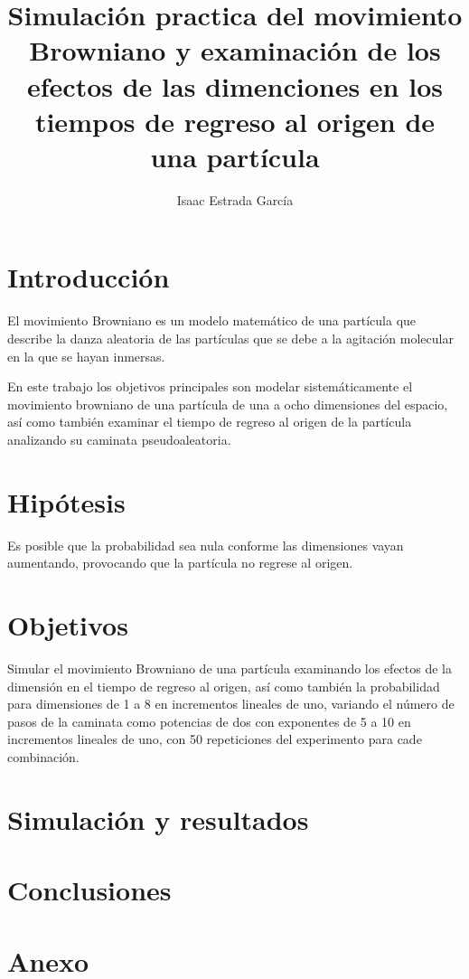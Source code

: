 \documentclass{article}
\title{Simulaci\'{o}n practica del movimiento Browniano y examinaci\'{o}n de los efectos de las dimenciones en los tiempos de regreso al origen de una part\'{i}cula}
\author{Isaac Estrada Garc\'{i}a }
\begin{document}
\maketitle

\section{Introducci\'{o}n}
El movimiento Browniano es un modelo matem\'{a}tico de una part\'{i}cula que describe la danza aleatoria de las part\'{i}culas que se debe a la agitaci\'{o}n molecular en la que se hayan inmersas.

En este trabajo los objetivos principales son modelar sistem\'{a}ticamente el movimiento browniano de una part\'{i}cula de una a ocho dimensiones del espacio, as\'{i} como tambi\'{e}n examinar el tiempo de regreso al origen de la part\'{i}cula analizando su caminata pseudoaleatoria.

\section{Hip\'{o}tesis}
Es posible que la probabilidad sea nula conforme las dimensiones vayan aumentando, provocando que la part\'{i}cula no regrese al origen.
\section{Objetivos}
Simular el movimiento Browniano de una part\'{i}cula examinando los efectos de la dimensi\'{o}n en el tiempo de regreso al origen, as\'{i} como tambi\'{e}n la probabilidad para dimensiones de 1 a 8 en incrementos lineales de uno, variando el n\'{u}mero de pasos de la caminata como potencias de dos con exponentes de 5 a 10 en incrementos lineales de uno, con 50 repeticiones del experimento para cade combinaci\'{o}n. 
\section{Simulaci\'{o}n y resultados}

\section{Conclusiones}

\section{Anexo}
\end{document}
